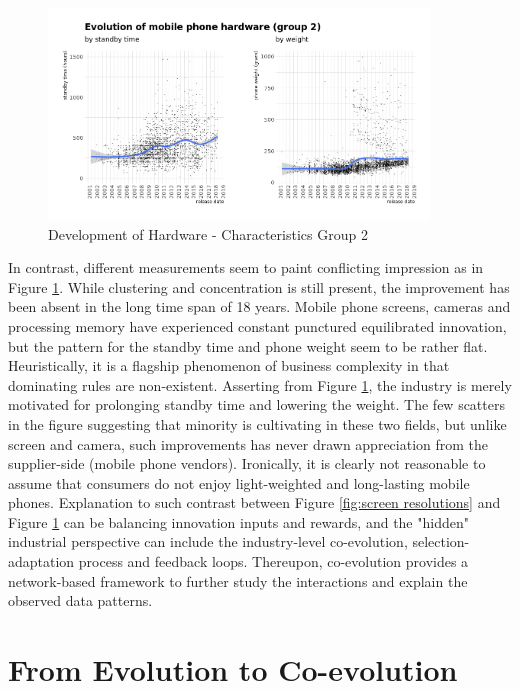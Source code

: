 \documentclass[utf8,english]{gradu3}
\begin{document}
\begin{figure}[htb]
    \centering
    \includegraphics[width=0.90\textwidth]{evo2.png}
    \caption{Development of Hardware - Characteristics Group 2}
    \label{fig:standby}
\end{figure}

In contrast, different measurements seem to paint conflicting impression as in Figure \ref{fig:standby}. While clustering and concentration is still present, the improvement has been absent in the long time span of 18 years. Mobile phone screens, cameras and processing memory have experienced constant punctured equilibrated innovation, but the pattern for the standby time and phone weight seem to be rather flat. Heuristically, it is a flagship phenomenon of business complexity in that dominating rules are non-existent. Asserting from Figure \ref{fig:standby}, the industry is merely motivated for prolonging standby time and lowering the weight. The few scatters in the figure suggesting that minority is cultivating in these two fields, but unlike screen and camera, such improvements has never drawn appreciation from the supplier-side (mobile phone vendors). Ironically, it is clearly not reasonable to assume that consumers do not enjoy light-weighted and long-lasting mobile phones. Explanation to such contrast between Figure \ref{fig:screen resolutions} and Figure \ref{fig:standby} can be balancing innovation inputs and rewards, and the "hidden" industrial perspective can include the industry-level co-evolution, selection-adaptation process and feedback loops. Thereupon, co-evolution provides a network-based framework to further study the interactions and explain the observed data patterns.

\section{From Evolution to Co-evolution}
\end{document}
